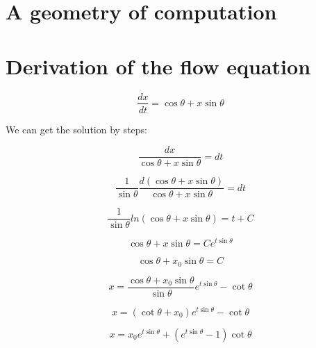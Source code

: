 \documentclass{article}
\begin{document}
\section{A geometry of computation}\label{sec:gioc}

\newpage



\newpage
\appendix

\section{Derivation of the flow equation}

\begin{equation}
    \frac{dx}{dt} = \cos \theta + x \sin \theta
\end{equation}

We can get the solution by steps:

\begin{equation}
    \frac{dx}{\cos \theta + x \sin \theta} = dt
\end{equation}

\begin{equation}
    \frac{1}{\sin \theta} \frac{d(\cos \theta + x \sin \theta)}{\cos \theta + x \sin \theta} = dt
\end{equation}

\begin{equation}
    \frac{1}{\sin \theta} ln(\cos \theta + x \sin \theta) = t + C
\end{equation}

\begin{equation}
    \cos \theta + x \sin \theta = C e^{t \sin \theta}
\end{equation}

\begin{equation}
    \cos \theta + x_0 \sin \theta = C
\end{equation}

\begin{equation}
   x = \frac{\cos \theta + x_0 \sin \theta}{\sin \theta} e^{t \sin \theta} - \cot \theta
\end{equation}

\begin{equation}
   x = (\cot \theta + x_0) e^{t \sin \theta} - \cot \theta
\end{equation}

\begin{equation}
   x =  x_0 e^{t \sin \theta} + (e^{t \sin \theta} - 1) \cot \theta
\end{equation}
\end{document}
